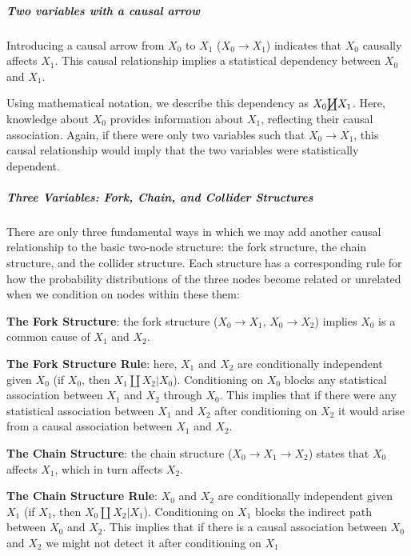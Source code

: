 \documentclass[
  singlecolumn]{article}
\let\oldsubparagraph\subparagraph
\renewcommand{\subparagraph}[1]{\oldsubparagraph{#1}\mbox{}}
\begin{document}
\subparagraph{\texorpdfstring{\textbf{Two variables with a causal
arrow}}{Two variables with a causal arrow}}\label{two-variables-with-a-causal-arrow}

Introducing a causal arrow from \(X_0\) to \(X_1\)
(\(X_0 \rightarrow X_1\)) indicates that \(X_0\) causally affects
\(X_1\). This causal relationship implies a statistical dependency
between \(X_0\) and \(X_1\).

Using mathematical notation, we describe this dependency as
\(X_0 \cancel\coprod X_1\). Here, knowledge about \(X_0\) provides
information about \(X_1\), reflecting their causal association. Again,
if there were only two variables such that \(X_0 \to X_1\), this causal
relationship would imply that the two variables were statistically
dependent.

\subparagraph{\texorpdfstring{\textbf{Three Variables: Fork, Chain, and
Collider
Structures}}{Three Variables: Fork, Chain, and Collider Structures}}\label{three-variables-fork-chain-and-collider-structures}

There are only three fundamental ways in which we may add another causal
relationship to the basic two-node structure: the fork structure, the
chain structure, and the collider structure. Each structure has a
corresponding rule for how the probability distributions of the three
nodes become related or unrelated when we condition on nodes within
these them:

\textbf{The Fork Structure}: the fork structure
(\(X_0 \rightarrow X_1\), \(X_0 \rightarrow X_2\)) implies \(X_0\) is a
common cause of \(X_1\) and \(X_2\).

\textbf{The Fork Structure Rule}: here, \(X_1\) and \(X_2\) are
conditionally independent given \(X_0\) (if \(\boxed{X_0}\), then
\(X_1 \coprod X_2 | X_0\)). Conditioning on \(X_0\) blocks any
statistical association between \(X_1\) and \(X_2\) through \(X_0\).
This implies that if there were any statistical association between
\(X_1\) and \(X_2\) after conditioning on \(X_2\) it would arise from a
causal association between \(X_1\) and \(X_2\).

\textbf{The Chain Structure}: the chain structure
(\(X_0 \rightarrow X_1 \rightarrow X_2\)) states that \(X_0\) affects
\(X_1\), which in turn affects \(X_2\).

\textbf{The Chain Structure Rule}: \(X_0\) and \(X_2\) are conditionally
independent given \(X_1\) (if \(\boxed{X_1}\), then
\(X_0 \coprod X_2 | X_1\)). Conditioning on \(X_1\) blocks the indirect
path between \(X_0\) and \(X_2\). This implies that if there is a causal
association between \(X_0\) and \(X_2\) we might not detect it after
conditioning on \(X_1\)
\end{document}
